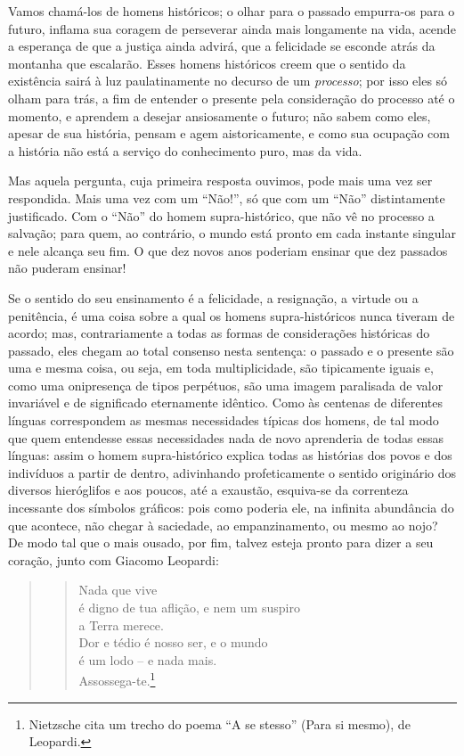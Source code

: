 Vamos chamá-los de homens históricos; o olhar para o passado empurra-os
para o futuro, inflama sua coragem de perseverar ainda mais longamente
na vida, acende a esperança de que a justiça ainda advirá, que a
felicidade se esconde atrás da montanha que escalarão. Esses homens
históricos creem que o sentido da existência sairá à luz paulatinamente
no decurso de um \emph{processo}; por isso eles só olham para trás, a
fim de entender o presente pela consideração do processo até o momento,
e aprendem a desejar ansiosamente o futuro; não sabem como eles, apesar
de sua história, pensam e agem aistoricamente, e como sua ocupação com a
história não está a serviço do conhecimento puro, mas da vida.

Mas aquela pergunta, cuja primeira resposta ouvimos, pode mais uma vez
ser respondida. Mais uma vez com um ``Não!'', só que com um ``Não''
distintamente justificado. Com o ``Não'' do homem supra-histórico, que não
vê no processo a salvação; para quem, ao contrário, o mundo está pronto
em cada instante singular e nele alcança seu fim. O que dez novos anos
poderiam ensinar que dez passados não puderam ensinar!

Se o sentido do seu ensinamento é a felicidade, a resignação, a virtude
ou a penitência, é uma coisa sobre a qual os homens supra-históricos
nunca tiveram de acordo; mas, contrariamente a todas as formas de
considerações históricas do passado, eles chegam ao total consenso nesta
sentença: o passado e o presente são uma e mesma coisa, ou seja, em toda
multiplicidade, são tipicamente iguais e, como uma onipresença de tipos
perpétuos, são uma imagem paralisada de valor invariável e de
significado eternamente idêntico.\label{eternamenteidentico} Como às centenas de diferentes línguas
correspondem as mesmas necessidades típicas dos homens, de tal modo que
quem entendesse essas necessidades nada de novo aprenderia de todas
essas línguas: assim o homem supra-histórico explica todas as histórias
dos povos e dos indivíduos a partir de dentro, adivinhando
profeticamente o sentido originário dos diversos hieróglifos e aos
poucos, até a exaustão, esquiva-se da correnteza incessante dos símbolos
gráficos: pois como poderia ele, na infinita abundância do que acontece,
não chegar à saciedade, ao empanzinamento, ou mesmo ao nojo? De modo tal
que o mais ousado, por fim, talvez esteja pronto para dizer a seu coração,
junto com Giacomo Leopardi:

\begin{quote}
\begin{verse}
Nada que vive\\
é digno de tua aflição, e nem um suspiro\\
a Terra merece.\\
Dor e tédio é nosso ser, e o mundo\\
é um lodo -- e nada mais.\\
Assossega-te.\footnote{Nietz\-sche cita um trecho do poema ``A se
  stesso'' (Para si mesmo), de Leopardi.}
\end{verse}
\end{quote}

